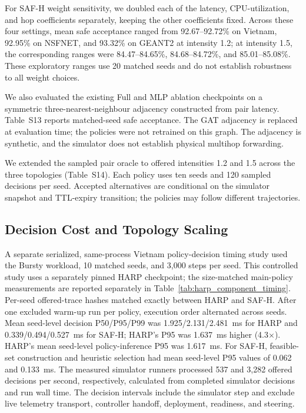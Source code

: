 \documentclass[final,5p]{elsarticle}
\newcommand{\rev}[1]{\textcolor{revisiongreen}{#1}}
\let\newrev\rev
\begin{document}
\newrev{For SAF-H weight sensitivity, we doubled each of the latency, CPU-utilization, and hop coefficients separately, keeping the other coefficients fixed. Across these four settings, mean safe acceptance ranged from 92.67--92.72\% on Vietnam, 92.95\% on NSFNET, and 93.32\% on GEANT2 at intensity 1.2; at intensity 1.5, the corresponding ranges were 84.47--84.65\%, 84.68--84.72\%, and 85.01--85.08\%. These exploratory ranges use 20 matched seeds and do not establish robustness to all weight choices.}

\newrev{We also evaluated the existing Full and MLP ablation checkpoints on a symmetric three-nearest-neighbour adjacency constructed from pair latency. Table~S13 reports matched-seed safe acceptance. The GAT adjacency is replaced at evaluation time; the policies were not retrained on this graph. The adjacency is synthetic, and the simulator does not establish physical multihop forwarding.}



\newrev{We extended the sampled pair oracle to offered intensities 1.2 and 1.5 across the three topologies (Table~S14). Each policy uses ten seeds and 120 sampled decisions per seed. Accepted alternatives are conditional on the simulator snapshot and TTL-expiry transition; the policies may follow different trajectories.}



\subsection{\newrev{Decision Cost and Topology Scaling}}
\label{subsec:decision_cost}
\newrev{A separate serialized, same-process Vietnam policy-decision timing study used the Bursty workload, 10 matched seeds, and 3,000 steps per seed. This controlled study uses a separately pinned HARP checkpoint; the size-matched main-policy measurements are reported separately in Table~\ref{tab:harp_component_timing}. Per-seed offered-trace hashes matched exactly between HARP and SAF-H. After one excluded warm-up run per policy, execution order alternated across seeds. Mean seed-level decision P50/P95/P99 was 1.925/2.131/2.481~ms for HARP and 0.339/0.494/0.527~ms for SAF-H; HARP's P95 was 1.637~ms higher (4.3$\times$). HARP's mean seed-level policy-inference P95 was 1.617~ms. For SAF-H, feasible-set construction and heuristic selection had mean seed-level P95 values of 0.062 and 0.133~ms. The measured simulator runners processed 537 and 3,282 offered decisions per second, respectively, calculated from completed simulator decisions and run wall time. The decision intervals include the simulator step and exclude live telemetry transport, controller handoff, deployment, readiness, and steering.}
\end{document}
